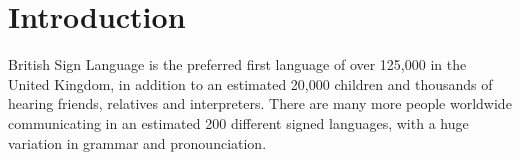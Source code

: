 \chapter{Introduction}
\ifpdf
    \graphicspath{{Introduction/IntroductionFigs/PNG/}{Introduction/IntroductionFigs/PDF/}{Introduction/IntroductionFigs/}}
\else
    \graphicspath{{Introduction/IntroductionFigs/EPS/}{Introduction/IntroductionFigs/}}
\fi

British Sign Language is the preferred first language of over 125,000 in the United Kingdom, in addition to an estimated 20,000 children and thousands of hearing friends, relatives and interpreters. There are many more people worldwide communicating in an estimated 200 different signed languages, with a huge variation in grammar and pronounciation.



